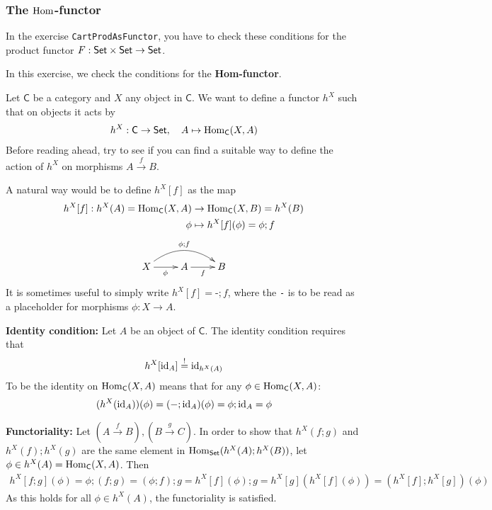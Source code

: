 \subsubsection{The $\operatorname{Hom}$-functor}
In the exercise \texttt{CartProdAsFunctor}, you have to check these conditions for the product functor $F: \text{\sffamily Set} \times \text{\sffamily Set} \to \text{\sffamily Set}$.

In this exercise, we check the conditions for the \textbf{Hom-functor}.

Let $\textsf{C}$ be a category and $X$ any object in $\textsf{C}$.
We want to define a functor $h^{X}$ such that on objects it acts by
\begin{align*}
  h^X: \textsf{C} \to \text{\sffamily Set},
  \quad
  A \mapsto \operatorname{Hom}_{\textsf{C}}(X,A)
\end{align*}
Before reading ahead, try to see if you can find a suitable way to define the action of $h^{X}$ on morphisms $A \stackrel{f}{\to}B$.

A natural way would be to define $h^{X}[f]$ as the map
\begin{align*}
  h^{X}[f]: h^{X}(A) = \Hom_{\textsf{C}}(X,A) 
  &\to \Hom_{\textsf{C}}(X,B) = h^{X}(B)
  \\
  \phi
  &\mapsto
  h^{X}[f](\phi) = \phi;f
\end{align*}
\begin{align*}
  \xymatrix{
    X
    \ar[r]_\phi
    \ar@/^4ex/[rr]^{\phi;f}
    &
    A
    \ar[r]_f
    &
    B
  }
\end{align*}
It is sometimes useful to simply write $h^{X}[f] = \texttt{-};f$, where the \texttt{-} is to be read as a placeholder for morphisms $\phi: X \to A$.

\textbf{Identity condition:} Let $A$ be an object of $\textsf{C}$.
The identity condition requires that
\begin{align*}
  h^{X}[\operatorname{id}_A] \stackrel{!}{=} \operatorname{id}_{h^{X}(A)}
\end{align*}
To be the identity on $\operatorname{Hom}_{\textsf{C}}(X,A)$ means that for any $\phi \in \Hom_{\textsf{C}}(X,A)$:
\begin{align*}
  (h^{X}(\id_A))(\phi) = (-;\id_A)(\phi) = \phi;\id_A = \phi
\end{align*}

\textbf{Functoriality:} Let $(A \stackrel{f}{\to}B),(B \stackrel{g}{\to}C)$.
In order to show that $h^{X}(f;g)$ and $h^{X}(f);h^{X}(g)$ are the same element in $\operatorname{Hom}_{\text{\sffamily Set}}(h^{X}(A);h^{X}(B))$, let $\phi \in h^{X}(A) = \Hom_{\textsf{C}}(X,A)$.
Then
\begin{align*}
  h^{X}[f;g](\phi) = \phi;(f;g) = (\phi;f);g = h^{X}[f](\phi);g = h^{X}[g]\left(h^{X}[f](\phi)\right)
  =
  (h^{X}[f]; h^{X}[g])(\phi)
\end{align*}
As this holds for all $\phi \in h^{X}(A)$, the functoriality is satisfied.





